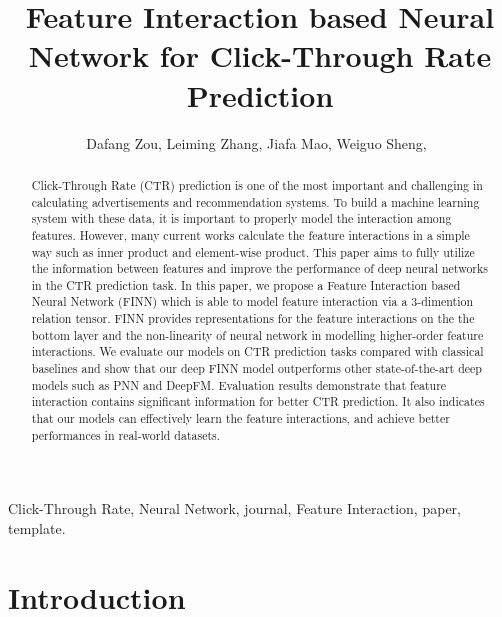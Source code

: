 \documentclass[journal]{IEEEtran}
\begin{document}
\title{Feature Interaction based Neural Network for Click-Through Rate Prediction}


\author{Dafang Zou,
        Leiming Zhang,
        Jiafa Mao,
        Weiguo Sheng,~
}









\maketitle

\begin{abstract}
Click-Through Rate (CTR) prediction is one of the most important and challenging in calculating advertisements and recommendation systems. To build a machine learning system with these data, it is important to properly model the interaction among features. However, many current works calculate the feature interactions in a simple way such as inner product and element-wise product. This paper aims to fully utilize the information between features and improve the performance of deep neural networks in the CTR prediction task. In this paper, we propose a Feature Interaction based Neural Network (FINN) which is able to model feature interaction via a 3-dimention relation tensor. FINN provides representations for the feature interactions on the the bottom layer and the non-linearity of neural network in modelling higher-order feature interactions. We evaluate our models on CTR prediction tasks compared with classical baselines and show that our deep FINN model outperforms other state-of-the-art deep models such as PNN and DeepFM. Evaluation results demonstrate that feature interaction contains significant information for better CTR prediction. It also indicates that our models can effectively learn the feature interactions, and achieve better performances in real-world datasets.
\end{abstract}

\begin{IEEEkeywords}
Click-Through Rate, Neural Network, journal, Feature Interaction, paper, template.
\end{IEEEkeywords}






\IEEEpeerreviewmaketitle



\section{Introduction}
\end{document}
